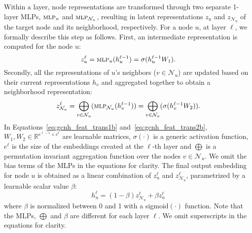 \documentclass[conference]{IEEEtran}
\begin{document}
Within a layer, node representations are transformed through two separate 1-layer MLPs, $\text{\textsc{mlp}}_u$ and $\text{\textsc{mlp}}_{\mathcal{N}_u}$, 
resulting in latent representations $z_u$ and $z_{\mathcal{N}_u}$ of the target node and its neighborhood, respectively.
For a node $u$, at layer $\ell$, we formally describe this step as follows. First, an intermediate representation is computed for the node $u$:
\begin{equation}
    \label{eq:gcnh_feat_trans1b}
    z_u^{\ell} = \text{\textsc{mlp}}_u(h_u^{\ell-1}) = \sigma(h_u^{\ell-1}W_1).
\end{equation}
Secondly, all the representations of $u$'s neighbors ($v \in \mathcal{N}_u$) are  updated based on their current representations $h_v$ and aggregated together to obtain a neighborhood representation:
\begin{equation}
    \label{eq:gcnh_feat_trans2b}
    z_{\mathcal{N}_u}^{\ell} = \bigoplus_{v\in \mathcal{N}_u}(\text{\textsc{mlp}}_{\mathcal{N}_u}(h_v^{\ell-1})) = 	\bigoplus_{v\in \mathcal{N}_u}(\sigma(h_v^{\ell-1}W_2)).
\end{equation}
In Equations~\ref{eq:gcnh_feat_trans1b} and~\ref{eq:gcnh_feat_trans2b}, $W_1, W_2 \in \mathbb{R}^{e^{\ell-1} \times e^{\ell}}$ are learnable matrices, $\sigma(\cdot)$ is a generic activation function, $e^{\ell}$ is the size of the embeddings created at the $\ell$-th layer and $\bigoplus$ is a permutation invariant aggregation function over the nodes $v \in \mathcal{N}_u$. We omit the bias terms of the MLPs in the equations for clarity.
The final output embedding for node $u$ is obtained as a linear combination of $z_u^{\ell}$ and $z_{\mathcal{N}_u}^{\ell}$, parametrized by a learnable scalar value $\beta$:
\begin{equation}
    \label{eq:gcnh_aggr}
    h_u^{\ell} = (1-\beta) z_{\mathcal{N}_u}^{\ell} + \beta z_u^{\ell}
\end{equation}
where $\beta$ is normalized between 0 and 1 with a sigmoid$(\cdot)$ function.
Note that the MLPs, $\bigoplus$ and $\beta$ are different for each layer $\ell$. We omit superscripts in the equations for clarity.
\end{document}
